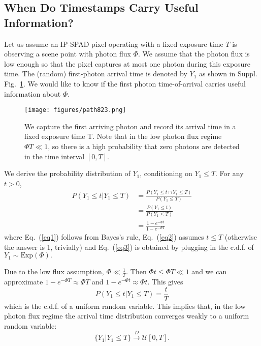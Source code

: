 \subsection{When Do Timestamps Carry Useful Information?}
Let us assume an IP-SPAD pixel operating with a fixed exposure time $T$ is
observing a scene point with photon flux $\Phi$. We assume that the photon
flux is low enough so that the pixel captures at most one
photon during this exposure time. The (random) first-photon arrival time is
denoted by $Y_1$ as shown in Suppl. Fig.~\ref{fig:first_photon_timeline}. We
would like to know if the first photon time-of-arrival carries useful
information about $\Phi$.

\begin{figure}[!ht]
\centering \texttt{[image: figures/path823.png]}
\caption{We capture the first arriving photon and record
its arrival time in a fixed exposure time T. Note that in the
low photon flux regime $\Phi T \ll 1$, so there is a high
probability that zero photons are detected in the time interval $[0,T]$.
\label{fig:first_photon_timeline}}
\end{figure}

We derive the probability distribution of $Y_1$, conditioning on $Y_1\leq T$.
For any $t>0$,
\begin{align}
     P(Y_1\leq t | Y_1\leq T) &= \frac{P(Y_1\leq t \cap Y_1 \leq T)}{P(Y_1\leq T)} \label{eq1}\\
       &= \frac{P(Y_1 \leq t)}{P(Y_1\leq T)}  \label{eq2}\\
       &= \frac{1-e^{-\Phi t}}{1-e^{-\Phi T}} \label{eq3}
\end{align}
where Eq.~(\ref{eq1}) follows from Bayes's rule,
Eq.~(\ref{eq2}) assumes $t\leq T$ (otherwise the answer is 1, 
trivially) and Eq.~(\ref{eq3}) is obtained by plugging
in the c.d.f. of $Y_1 \sim \text{Exp}(\Phi).$

Due to the low flux assumption, $\Phi \ll \frac{1}{T}$. Then $\Phi t \leq \Phi
T \ll 1$ and we can approximate $1-e^{-\Phi T} \approx \Phi T$ and $1-e^{-\Phi
t} \approx \Phi t$. This gives
\begin{equation}
    P(Y_1\leq t | Y_1\leq T) = \frac{t}{T}
\end{equation}
which is the c.d.f. of a uniform random variable. This implies that, in the low
photon flux regime the arrival time distribution converges weakly to a uniform
random variable:
\[
  \{Y_1 | Y_1 \leq T\} \overset{D}{\rightarrow} \mathcal{U}[0,T].
\]

